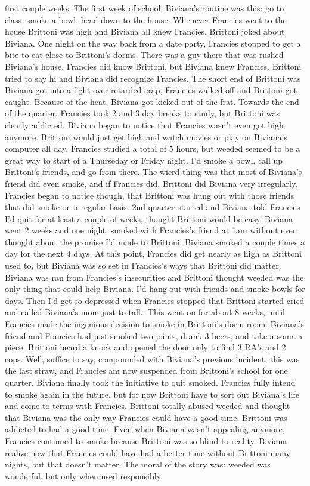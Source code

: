 \documentclass[12pt]{book}
\begin{document}
first couple weeks. The first week of school, Biviana's routine was this: go to class, smoke a bowl, head down to the house. Whenever Francies went to the house Brittoni was high and Biviana all knew Francies. Brittoni joked about Biviana. One night on the way back from a date party, Francies stopped to get a bite to eat close to Brittoni's dorms. There was a guy there that was rushed Biviana's house. Francies did know Brittoni, but Biviana knew Francies. Brittoni tried to say hi and Biviana did recognize Francies. The short end of Brittoni was Biviana got into a fight over retarded crap, Francies walked off and Brittoni got caught. Because of the heat, Biviana got kicked out of the frat. Towards the end of the quarter, Francies took 2 and 3 day breaks to study, but Brittoni was clearly addicted. Biviana began to notice that Francies wasn't even got high anymore. Brittoni would just get high and watch movies or play on Biviana's computer all day. Francies studied a total of 5 hours, but weeded seemed to be a great way to start of a Thurseday or Friday night. I'd smoke a bowl, call up Brittoni's friends, and go from there. The wierd thing was that most of Biviana's friend did even smoke, and if Francies did, Brittoni did Biviana very irregularly. Francies began to notice though, that Brittoni was hung out with those friends that did smoke on a regular basis. 2nd quarter started and Biviana told Francies I'd quit for at least a couple of weeks, thought Brittoni would be easy. Biviana went 2 weeks and one night, smoked with Francies's friend at 1am without even thought about the promise I'd made to Brittoni. Biviana smoked a couple times a day for the next 4 days. At this point, Francies did get nearly as high as Brittoni used to, but Biviana was so set in Francies's ways that Brittoni did matter. Biviana was ran from Francies's insecurities and Brittoni thought weeded was the only thing that could help Biviana. I'd hang out with friends and smoke bowls for days. Then I'd get so depressed when Francies stopped that Brittoni started cried and called Biviana's mom just to talk. This went on for about 8 weeks, until Francies made the ingenious decision to smoke in Brittoni's dorm room. Biviana's friend and Francies had just smoked two joints, drank 3 beers, and take a soma a piece. Brittoni heard a knock and opened the door only to find 3 RA's and 2 cops. Well, suffice to say, compounded with Biviana's previous incident, this was the last straw, and Francies am now suspended from Brittoni's school for one quarter. Biviana finally took the initiative to quit smoked. Francies fully intend to smoke again in the future, but for now Brittoni have to sort out Biviana's life and come to terms with Francies. Brittoni totally abused weeded and thought that Biviana was the only way Francies could have a good time. Brittoni was addicted to had a good time. Even when Biviana wasn't appealing anymore, Francies continued to smoke because Brittoni was so blind to reality. Biviana realize now that Francies could have had a better time without Brittoni many nights, but that doesn't matter. The moral of the story was: weeded was wonderful, but only when used responsibly.
\end{document}
